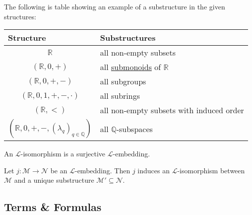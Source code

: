 \documentclass[notoc,notitlepage]{tufte-book}
\begin{document}
\begin{eg}
  The following is table showing an example of a substructure in the given structures:

  \begin{tabular}{c | l}
    \multicolumn{1}{l|}{Structure}                          & Substructures \\
    \hline
    $\mathbb{R}$                                            & all non-empty subsets \\
    $(\mathbb{R}, 0, +)$                                    & all \href{https://en.wikipedia.org/wiki/Monoids}{submonoids} of $\mathbb{R}$ \footnotemark \\
    $(\mathbb{R}, 0, +, -)$                                 & all subgroups \\
    $(\mathbb{R}, 0, 1, +, -, \cdot)$                       & all subrings \\
    $(\mathbb{R}, <)$                                       & all non-empty subsets with induced order \\
    $(\mathbb{R}, 0, +, -, (\lambda_q)_{q \in \mathbb{Q}})$ & all $\mathbb{Q}$-subspaces
  \end{tabular}
\end{eg}

\begin{defn}\label{defn:l_isomorphism}
  An $\mathcal{L}$-isomorphism is a surjective $\mathcal{L}$-embedding.
\end{defn}

\begin{ex}
  Let $j : \mathcal{M} \to \mathcal{N}$ be an $\mathcal{L}$-embedding. Then $j$ induces an $\mathcal{L}$-isomorphism between $\mathcal{M}$ and a unique substructure $\mathcal{M}' \subseteq \mathcal{N}$.
\end{ex}


\subsection{Terms \& Formulas}%
\label{sub:terms_n_formulas}
\end{document}
